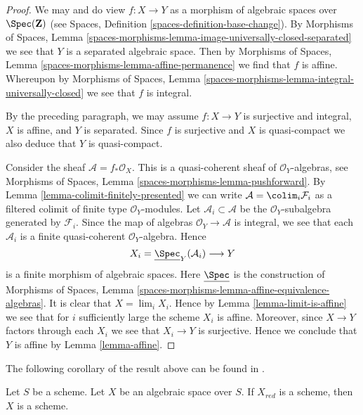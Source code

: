 \begin{proof}
We may and do view $f : X \to Y$ as a morphism of algebraic spaces over
$\Spec(\mathbf{Z})$ (see
Spaces, Definition \ref{spaces-definition-base-change}).
By Morphisms of Spaces, Lemma
\ref{spaces-morphisms-lemma-image-universally-closed-separated}
we see that $Y$ is a separated algebraic space. Then by
Morphisms of Spaces, Lemma \ref{spaces-morphisms-lemma-affine-permanence}
we find that $f$ is affine. Whereupon by
Morphisms of Spaces, Lemma
\ref{spaces-morphisms-lemma-integral-universally-closed}
we see that $f$ is integral.

\medskip\noindent
By the preceding paragraph, we may assume $f : X \to Y$
is surjective and integral, $X$ is affine, and $Y$ is separated.
Since $f$ is surjective and $X$ is quasi-compact we also deduce that $Y$ is
quasi-compact.

\medskip\noindent
Consider the sheaf $\mathcal{A} = f_*\mathcal{O}_X$.
This is a quasi-coherent sheaf of $\mathcal{O}_Y$-algebras, see
Morphisms of Spaces, Lemma \ref{spaces-morphisms-lemma-pushforward}.
By Lemma \ref{lemma-colimit-finitely-presented}
we can write $\mathcal{A} = \colim_i \mathcal{F}_i$ as a filtered
colimit of finite type $\mathcal{O}_Y$-modules. Let
$\mathcal{A}_i \subset \mathcal{A}$ be the $\mathcal{O}_Y$-subalgebra
generated by $\mathcal{F}_i$. Since the map of algebras
$\mathcal{O}_Y \to \mathcal{A}$ is integral, we see that each $\mathcal{A}_i$
is a finite quasi-coherent $\mathcal{O}_Y$-algebra. Hence
$$
X_i = \underline{\Spec}_Y(\mathcal{A}_i) \longrightarrow Y
$$
is a finite morphism of algebraic spaces. Here 
$\underline{\Spec}$ is the construction of Morphisms of Spaces, Lemma
\ref{spaces-morphisms-lemma-affine-equivalence-algebras}.
It is clear
that $X = \lim_i X_i$. Hence by
Lemma \ref{lemma-limit-is-affine}
we see that for $i$ sufficiently large the scheme $X_i$ is affine.
Moreover, since $X \to Y$ factors through each $X_i$ we see that
$X_i \to Y$ is surjective. Hence we conclude that $Y$ is affine by
Lemma \ref{lemma-affine}.
\end{proof}

\noindent
The following corollary of the result above can be found in
\cite{CLO}.

\begin{lemma}
\label{lemma-reduction-scheme}
\begin{reference}
\cite[3.1.12]{CLO}
\end{reference}
Let $S$ be a scheme. Let $X$ be an algebraic space over $S$.
If $X_{red}$ is a scheme, then $X$ is a scheme.
\end{lemma}

